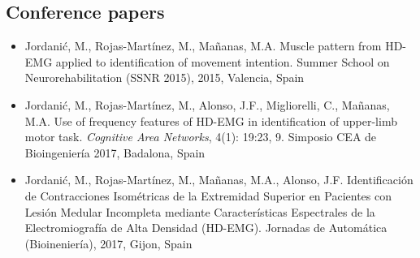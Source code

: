 \subsection{Conference papers}

\begin{itemize}
\item Jordanić, M., Rojas-Martínez, M., Mañanas, M.A. Muscle pattern from HD-EMG applied to identification of movement intention. Summer School on Neurorehabilitation (SSNR 2015), 2015, Valencia, Spain

\item Jordanić, M., Rojas-Martínez, M., Alonso, J.F., Migliorelli, C., Mañanas, M.A.  Use of frequency features of HD-EMG in identification of upper-limb motor task. \textit{Cognitive Area Networks}, 4(1): 19:23, 9. Simposio CEA de Bioingeniería 2017, Badalona, Spain

\item Jordanić, M., Rojas-Martínez, M., Mañanas, M.A., Alonso, J.F. Identificación de Contracciones Isométricas de la Extremidad Superior en Pacientes con Lesión Medular Incompleta mediante Características Espectrales de la Electromiografía de Alta Densidad (HD-EMG). Jornadas de Automática (Bioineniería), 2017, Gijon, Spain

\end{itemize}


